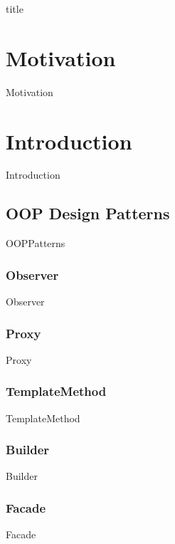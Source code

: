 \documentclass{article}
\begin{document}
{title}

\frontmatter

\tableofcontents

\listoffigures
\listoftables

\mainmatter

\section{Motivation}
    {Motivation}

\section{Introduction}
    {Introduction}

    \subsection{OOP Design Patterns}
        {OOPPatterns}

        \subsubsection{Observer}
            {Observer}

        \subsubsection{Proxy}
            {Proxy}

        \subsubsection{TemplateMethod}
            {TemplateMethod}

        \subsubsection{Builder}
            {Builder}

        \subsubsection{Facade}
            {Facade}
\end{document}
